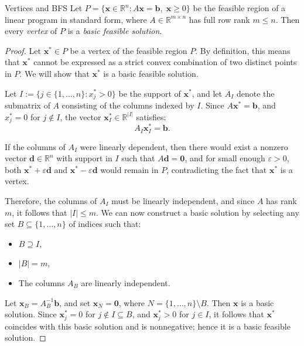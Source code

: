 \begin{proposition}{Vertices and BFS}
Let \( P = \{ \mathbf{x} \in \mathbb{R}^n : A\mathbf{x} = \mathbf{b},\; \mathbf{x} \geq 0 \} \) be the feasible region of a linear program in standard form, where \( A \in \mathbb{R}^{m \times n} \) has full row rank \( m \leq n \). Then every \emph{vertex} of \( P \) is a \emph{basic feasible solution}.
\end{proposition}

\begin{proof}
Let \( \mathbf{x}^* \in P \) be a vertex of the feasible region \( P \). By definition, this means that \( \mathbf{x}^* \) cannot be expressed as a strict convex combination of two distinct points in \( P \). We will show that \( \mathbf{x}^* \) is a basic feasible solution.

Let \( I := \{ j \in \{1, \dots, n\} : x^*_j > 0 \} \) be the support of \( \mathbf{x}^* \), and let \( A_I \) denote the submatrix of \( A \) consisting of the columns indexed by \( I \). Since \( A\mathbf{x}^* = \mathbf{b} \), and \( x^*_j = 0 \) for \( j \notin I \), the vector \( \mathbf{x}^*_I \in \mathbb{R}^{|I|} \) satisfies:
\[
A_I \mathbf{x}^*_I = \mathbf{b}.
\]

If the columns of \( A_I \) were linearly dependent, then there would exist a nonzero vector \( \mathbf{d} \in \mathbb{R}^n \) with support in \( I \) such that \( A\mathbf{d} = \mathbf{0} \), and for small enough \( \varepsilon > 0 \), both \( \mathbf{x}^* + \varepsilon \mathbf{d} \) and \( \mathbf{x}^* - \varepsilon \mathbf{d} \) would remain in \( P \), contradicting the fact that \( \mathbf{x}^* \) is a vertex.

Therefore, the columns of \( A_I \) must be linearly independent, and since \( A \) has rank \( m \), it follows that \( |I| \leq m \). We can now construct a basic solution by selecting any set \( B \subseteq \{1, \dots, n\} \) of indices such that:
\begin{itemize}
    \item \( B \supseteq I \),
    \item \( |B| = m \),
    \item The columns \( A_B \) are linearly independent.
\end{itemize}

Let \( \mathbf{x}_B = A_B^{-1} \mathbf{b} \), and set \( \mathbf{x}_N = \mathbf{0} \), where \( N = \{1, \dots, n\} \setminus B \). Then \( \mathbf{x} \) is a basic solution. Since \( \mathbf{x}^*_j = 0 \) for \( j \notin I \subseteq B \), and \( \mathbf{x}^*_j > 0 \) for \( j \in I \), it follows that \( \mathbf{x}^* \) coincides with this basic solution and is nonnegative; hence it is a basic feasible solution.
\end{proof}

